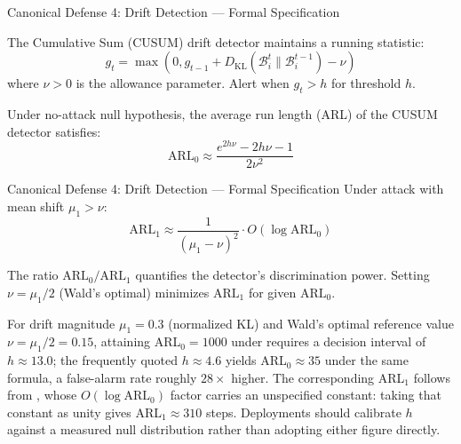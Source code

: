 \documentclass[
  ignorenonframetext,
]{beamer}
\providecommand{\cref}[1]{\texttt{\detokenize{#1}}}
\begin{document}
\begin{frame}[allowframebreaks]{Canonical Defense 4: Drift Detection ---
Formal Specification}
\protect{}\label{canonical-defense-4-drift-detection-formal-specification}
\begin{definition}
\label{def:cusum-detector}
The Cumulative Sum (CUSUM) drift detector \cite{page1954continuous} maintains a running statistic:
\begin{equation}
\label{eq:cusum}
g_t = \max(0, g_{t-1} + D_{\mathrm{KL}}(\mathcal{B}_i^t \| \mathcal{B}_i^{t-1}) - \nu)
\end{equation}
where $\nu > 0$ is the allowance parameter. Alert when $g_t > h$ for threshold $h$.
\end{definition}

\begin{theorem}
\label{thm:cusum-arl}
Under no-attack null hypothesis, the average run length (ARL) of the CUSUM detector satisfies:
\begin{equation}
\label{eq:cusum-arl}
\text{ARL}_0 \approx \frac{e^{2h\nu} - 2h\nu - 1}{2\nu^2}
\end{equation}
\end{theorem}

\end{frame}

\begin{frame}[allowframebreaks]{Canonical Defense 4: Drift Detection ---
Formal Specification}
Under attack with mean shift \(\mu_1 > \nu\): \begin{equation}
\label{eq:cusum-arl1}
\text{ARL}_1 \approx \frac{1}{(\mu_1 - \nu)^2} \cdot O(\log \text{ARL}_0)
\end{equation}

The ratio \(\text{ARL}_0 / \text{ARL}_1\) quantifies the detector's
discrimination power. Setting \(\nu = \mu_1/2\) (Wald's optimal)
minimizes \(\text{ARL}_1\) for given \(\text{ARL}_0\).

\begin{corollary}
\label{cor:drift-sample}
For drift magnitude $\mu_1 = 0.3$ (normalized KL) and Wald's optimal reference value $\nu = \mu_1/2 = 0.15$, attaining ARL$_0 = 1000$ under \cref{eq:cusum-arl} requires a decision interval of $h \approx 13.0$; the frequently quoted $h \approx 4.6$ yields ARL$_0 \approx 35$ under the same formula, a false-alarm rate roughly $28\times$ higher. The corresponding ARL$_1$ follows from \cref{eq:cusum-arl1}, whose $O(\log \text{ARL}_0)$ factor carries an unspecified constant: taking that constant as unity gives ARL$_1 \approx 310$ steps. Deployments should calibrate $h$ against a measured null distribution rather than adopting either figure directly.
\end{corollary}
\end{frame}
\end{document}
